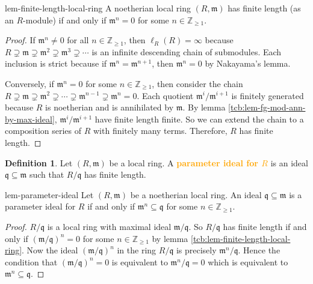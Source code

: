 \documentclass[a4paper,10pt]{article}
\makeatletter
\theoremstyle{definition}
\newtheorem{definition}[tcb@cnt@theorem]{Definition}
\newcommand\lref[2][blue!60!black]{lemma \ref{tcb:#2}}
\newcommand\dni[1]{\textbf{\textcolor{orange}{#1}}}
\renewcommand\geq{\geqslant}
\makeatother
\begin{document}
\begin{lemma}{}{lem-finite-length-local-ring}
A noetherian local ring $(R,\mathfrak{m})$ has finite length (as an $R$-module) 
if and only if $\mathfrak{m}^n=0$ for some $n\in\mathbb{Z}_{\geq1}$.
\end{lemma}
\begin{proof}
If $\mathfrak{m}^n\not=0$ for all $n\in\mathbb{Z}_{\geq1}$, 
then $\ell_R(R)=\infty$ because $R\supsetneq\mathfrak{m}
\supsetneq\mathfrak{m}^2\supsetneq\mathfrak{m}^3\supsetneq\cdots$ 
is an infinite descending chain of submodules.
Each inclusion is strict because if $\mathfrak{m}^n=\mathfrak{m}^{n+1}$,
then $\mathfrak{m}^n=0$ by Nakayama's lemma.

Conversely, if $\mathfrak{m}^n=0$ for some $n\in\mathbb{Z}_{\geq1}$,
then consider the chain $R\supsetneq\mathfrak{m}\supsetneq\mathfrak{m}^2
\supsetneq\cdots\supsetneq\mathfrak{m}^{n-1}\supsetneq\mathfrak{m}^n=0$.
Each quotient $\mathfrak{m}^i/\mathfrak{m}^{i+1}$ is finitely generated 
because $R$ is noetherian and is annihilated by $\mathfrak{m}$.
By \lref{lem-fg-mod-ann-by-max-ideal}, $\mathfrak{m}^i/\mathfrak{m}^{i+1}$ 
have finite length finite.
So we can extend the chain to a composition series of $R$ 
with finitely many terms.
Therefore, $R$ has finite length.
\end{proof}

\begin{definition}
Let $(R,\mathfrak{m})$ be a local ring.
A \dni{parameter ideal for $R$} 
is an ideal $\mathfrak{q}\subseteq\mathfrak{m}$ such that 
$R/\mathfrak{q}$ has finite length.
\end{definition}

\begin{lemma}{}{lem-parameter-ideal}
Let $(R,\mathfrak{m})$ be a noetherian local ring.
An ideal $\mathfrak{q}\subseteq\mathfrak{m}$ is a parameter ideal for $R$
if and only if $\mathfrak{m}^n\subseteq\mathfrak{q}$ for some 
$n\in\mathbb{Z}_{\geq1}$. 
\end{lemma}
\begin{proof}
$R/\mathfrak{q}$ is a local ring with maximal ideal $\mathfrak{m}/\mathfrak{q}$.
So $R/\mathfrak{q}$ has finite length if and only if 
$(\mathfrak{m}/\mathfrak{q})^n=0$ for some $n\in\mathbb{Z}_{\geq1}$
by \lref{lem-finite-length-local-ring}.
Now the ideal $(\mathfrak{m}/\mathfrak{q})^n$ in the ring $R/\mathfrak{q}$
is precisely $\mathfrak{m}^n/\mathfrak{q}$.
Hence the condition that $(\mathfrak{m}/\mathfrak{q})^n=0$
is equivalent to $\mathfrak{m}^n/\mathfrak{q}=0$
which is equivalent to $\mathfrak{m}^n\subseteq\mathfrak{q}$.
\end{proof}
\end{document}
